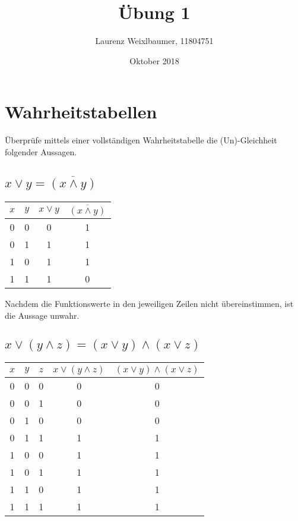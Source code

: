 \documentclass{article}
\title{Übung 1}
\author{Laurenz Weixlbaumer, 11804751}
\date{Oktober 2018}
\begin{document}
\maketitle

\section{Wahrheitstabellen}
Überprüfe mittels einer vollständigen Wahrheitstabelle die (Un)-Gleichheit folgender Aussagen.

\subsection{$x \lor y = \overline{(x \land y)}$}

\begin{center}
\begin{tabular}{c | c || c | c}
    $x$ & $y$ & $x \lor y$ & $\overline{(x \land y)}$\\
    \hline
    0 & 0 & 0 & 1\\
    0 & 1 & 1 & 1\\
    1 & 0 & 1 & 1\\
    1 & 1 & 1 & 0
\end{tabular}
\end{center}

\vspace{10px}

Nachdem die Funktionswerte in den jeweiligen Zeilen nicht übereinstimmen, ist die Aussage unwahr.

\vspace{10px}

\subsection{$x \lor (y \land z) = (x \lor y) \land (x \lor z)$}

\begin{center}
\begin{tabular}{c | c | c || c | c}
    $x$ & $y$ & $z$ & $x \lor (y \land z)$ & $(x \lor y) \land (x \lor z)$\\
    \hline
    0 & 0 & 0 & 0 & 0\\
    0 & 0 & 1 & 0 & 0\\
    0 & 1 & 0 & 0 & 0\\
    0 & 1 & 1 & 1 & 1\\
    1 & 0 & 0 & 1 & 1\\
    1 & 0 & 1 & 1 & 1\\
    1 & 1 & 0 & 1 & 1\\
    1 & 1 & 1 & 1 & 1
\end{tabular}
\end{center}
\end{document}
